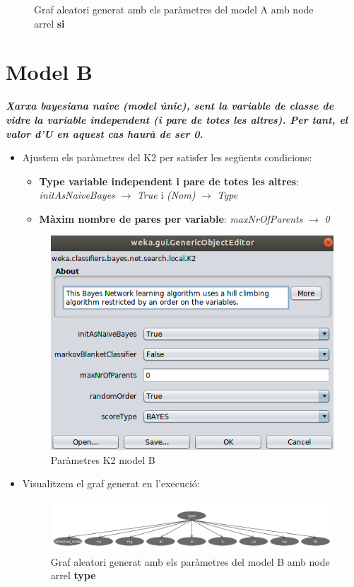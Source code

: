 \documentclass[11pt,a4paper]{article}
\begin{document}
\begin{itemize}
\begin{figure}[hbtp]
	\caption{Graf aleatori generat amb els paràmetres del model A amb node arrel \textbf{si}}
	\end{figure}
\end{itemize}

\newpage

\section{Model B}
\textbf{\textit{Xarxa bayesiana naive (model únic), sent la variable de classe de vidre la variable independent (i pare de totes les altres). Per tant, el valor d'U en aquest cas haurà de ser 0.}}\\
\begin{itemize}
\item Ajustem els paràmetres del K2 per satisfer les següents condicions:
	\begin{itemize}
	\item \textbf{Type variable independent i pare de totes les altres}: \textit{initAsNaiveBayes} $\rightarrow$ \textit{True} i \textit{(Nom)} $\rightarrow$ \textit{Type}
	\item \textbf{Màxim nombre de pares per variable}:  
 \textit{maxNrOfParents} $\rightarrow$ \textit{0}
	\end{itemize}
	\begin{figure}[hbtp]
	\centering
	\includegraphics[scale=0.4]{Figures/6.png}
	\caption{Paràmetres K2 model B}
	\end{figure}

\item Visualitzem el graf generat en l'execució:
	\begin{figure}[hbtp]
	\centering
	\includegraphics[scale=0.4]{Figures/r2.png}
	\caption{Graf aleatori generat amb els paràmetres del model B amb node arrel \textbf{type}}
	\end{figure}
\end{itemize}
\end{document}
